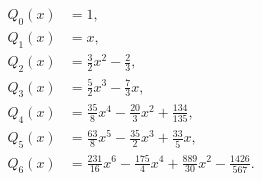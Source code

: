 \begin{align*}
Q_{0}(x)&=1,\\
Q_{1}(x)&=x,\\
Q_{2}(x)&=\frac{3}{2}x^{2} - \frac{2}{3},\\
Q_{3}(x)&=\frac{5}{2}x^{3} - \frac{7}{3}x,\\
Q_{4}(x)&=\frac{35}{8}x^{4} - \frac{20}{3}x^{2} + \frac{134}{135},\\
Q_{5}(x)&=\frac{63}{8}x^{5} - \frac{35}{2}x^{3} + \frac{33}{5}x,\\
Q_{6}(x)&=\frac{231}{16}x^{6} - \frac{175}{4}x^{4} + \frac{889}{30}x^{2} - \frac{1426}{567}.
\end{align*}
